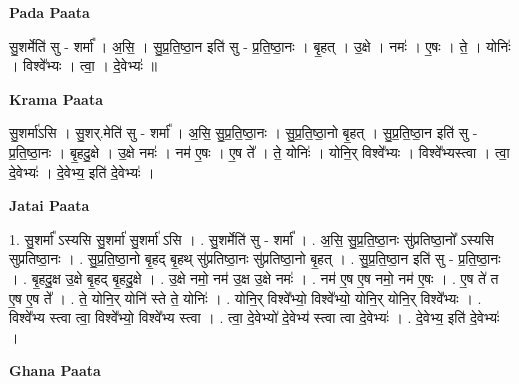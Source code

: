 \documentclass[17pt]{extarticle}
\begin{document}
\textbf{Pada Paata} \newline

सु॒शर्मेति॑ सु - शर्मा᳚ । अ॒सि॒ । सु॒प्र॒ति॒ष्ठा॒न इति॑ सु - प्र॒ति॒ष्ठा॒नः । बृ॒हत् । उ॒क्षे । नमः॑ । ए॒षः । ते॒ । योनिः॑ । विश्वे᳚भ्यः । त्वा॒ । दे॒वेभ्यः॑ ॥  \newline


\textbf{Krama Paata} \newline

सु॒शर्मा॑ऽसि । सु॒शर्.मेति॑ सु - शर्मा᳚ । अ॒सि॒ सु॒प्र॒ति॒ष्ठा॒नः । सु॒प्र॒ति॒ष्ठा॒नो बृ॒हत् । सु॒प्र॒ति॒ष्ठा॒न इति॑ सु - प्र॒ति॒ष्ठा॒नः । बृ॒हदु॒क्षे । उ॒क्षे नमः॑ । नम॑ ए॒षः । ए॒ष ते᳚ । ते॒ योनिः॑ । योनि॒र् विश्वे᳚भ्यः । विश्वे᳚भ्यस्त्वा । त्वा॒ दे॒वेभ्यः॑ । दे॒वेभ्य॒ इति॑ दे॒वेभ्यः॑ । \newline

\textbf{Jatai Paata} \newline

1. सु॒शर्मा᳚ ऽस्यसि सु॒शर्मा॑ सु॒शर्मा॑ ऽसि । . सु॒शर्मेति॑ सु - शर्मा᳚ । . अ॒सि॒ सु॒प्र॒ति॒ष्ठा॒नः सु॑प्रतिष्ठा॒नो᳚ ऽस्यसि सुप्रतिष्ठा॒नः । . सु॒प्र॒ति॒ष्ठा॒नो बृ॒हद् बृ॒हथ् सु॑प्रतिष्ठा॒नः सु॑प्रतिष्ठा॒नो बृ॒हत् । . सु॒प्र॒ति॒ष्ठा॒न इति॑ सु - प्र॒ति॒ष्ठा॒नः । . बृ॒हदु॒क्ष उ॒क्षे बृ॒हद् बृ॒हदु॒क्षे । . उ॒क्षे नमो॒ नम॑ उ॒क्ष उ॒क्षे नमः॑ । . नम॑ ए॒ष ए॒ष नमो॒ नम॑ ए॒षः । . ए॒ष ते॑ त ए॒ष ए॒ष ते᳚ । . ते॒ योनि॒र् योनि॑ स्ते ते॒ योनिः॑ । . योनि॒र् विश्वे᳚भ्यो॒ विश्वे᳚भ्यो॒ योनि॒र् योनि॒र् विश्वे᳚भ्यः । . विश्वे᳚भ्य स्त्वा त्वा॒ विश्वे᳚भ्यो॒ विश्वे᳚भ्य स्त्वा । . त्वा॒ दे॒वेभ्यो॑ दे॒वेभ्य॑ स्त्वा त्वा दे॒वेभ्यः॑ । . दे॒वेभ्य॒ इति॑ दे॒वेभ्यः॑ । \newline

\textbf{Ghana Paata } \newline
\end{document}
